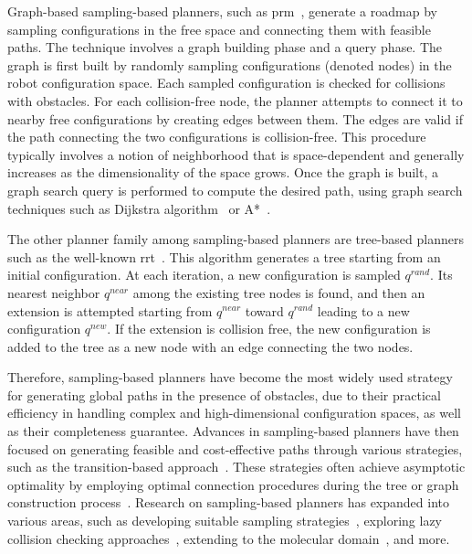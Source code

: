 Graph-based sampling-based planners, such as \gls{prm}~\cite{cPRM}, generate a roadmap by sampling configurations in the free space and connecting them with feasible paths. 
The technique involves a graph building phase and a query phase.
The graph is first built by randomly sampling configurations (denoted nodes) in the robot configuration space.
Each sampled configuration is checked for collisions with obstacles.
For each collision-free node, the planner attempts to connect it to nearby free configurations by creating edges between them.  
The edges are valid if the path connecting the two configurations is collision-free.
This procedure typically involves a notion of neighborhood that is space-dependent and generally increases as the dimensionality of the space grows.
Once the graph is built, a graph search query is performed to compute the desired path, using graph search techniques such as Dijkstra algorithm~\cite{cDijk} or A*~\cite{cA*}.

The other planner family among sampling-based planners are tree-based planners such as the well-known \gls{rrt}~\cite{cRRT}.
This algorithm generates a tree starting from an initial configuration.
At each iteration, a new configuration is sampled $q^{rand}$.
Its nearest neighbor $q^{near}$ among the existing tree nodes is found, and then an extension is attempted starting from $q^{near}$ toward $q^{rand}$ leading to a new configuration $q^{new}$.
If the extension is collision free, the new configuration is added to the tree as a new node with an edge connecting the two nodes.

Therefore, sampling-based planners have become the most widely used strategy for generating global paths in the presence of obstacles, due to their practical efficiency in handling complex and high-dimensional configuration spaces, as well as their completeness guarantee.
Advances in sampling-based planners have then focused on generating feasible and cost-effective paths through various strategies, such as the transition-based approach~\cite{cTRRT}. 
These strategies often achieve asymptotic optimality by employing optimal connection procedures during the tree or graph construction process~\cite{cRRTstar, cTRRTstar, cFMT}.
Research on sampling-based planners has expanded into various areas, such as developing suitable sampling strategies~\cite{cSampling}, exploring lazy collision checking approaches~\cite{cLazy1}, extending to the molecular domain~\cite{cMolecular}, and more.

